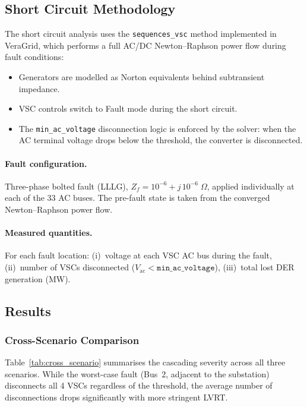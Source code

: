\subsection{Short Circuit Methodology}
\label{sec:methodology}

The short circuit analysis uses the \texttt{sequences\_vsc} method implemented in VeraGrid, which performs a full AC/DC Newton--Raphson power flow during fault conditions:
\begin{itemize}
    \item Generators are modelled as Norton equivalents behind subtransient impedance.
    \item VSC controls switch to Fault mode during the short circuit.
    \item The \texttt{min\_ac\_voltage} disconnection logic is enforced by the solver: when the AC terminal voltage drops below the threshold, the converter is disconnected.
\end{itemize}

\paragraph{Fault configuration.}
Three-phase bolted fault (LLLG), $Z_f = 10^{-6} + j\,10^{-6}\;\Omega$, applied individually at each of the 33 AC buses. The pre-fault state is taken from the converged Newton--Raphson power flow.

\paragraph{Measured quantities.}
For each fault location: (i)~voltage at each VSC AC bus during the fault, (ii)~number of VSCs disconnected ($V_\mathrm{ac} < \texttt{min\_ac\_voltage}$), (iii)~total lost DER generation (MW).


\subsection{Results}
\label{sec:results}

\subsubsection{Cross-Scenario Comparison}

Table~\ref{tab:cross_scenario} summarises the cascading severity across all three scenarios. While the worst-case fault (Bus~2, adjacent to the substation) disconnects all 4 VSCs regardless of the threshold, the average number of disconnections drops significantly with more stringent LVRT.

